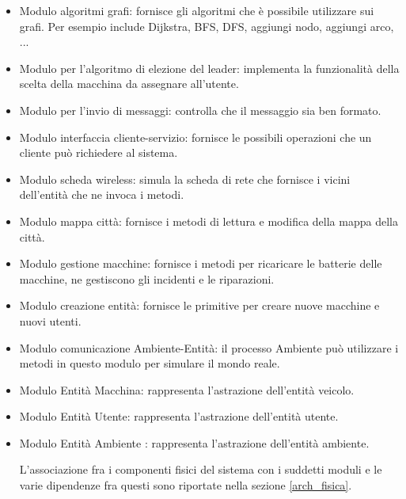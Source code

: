 \begin{itemize} 
	
	\item Modulo algoritmi grafi: fornisce gli algoritmi che è possibile utilizzare sui grafi. Per esempio include Dijkstra, BFS, DFS, aggiungi nodo, aggiungi arco, ... 
	
	\item Modulo per l'algoritmo di elezione del leader: implementa la funzionalità della scelta della macchina da assegnare all'utente.
	
	\item Modulo per l'invio di messaggi: controlla che il messaggio sia ben formato.
	
	\item Modulo interfaccia cliente-servizio: fornisce le possibili operazioni che un cliente può richiedere al sistema.
	
	\item Modulo scheda wireless: simula la scheda di rete che fornisce i vicini dell'entità che ne invoca i metodi.
	
	\item Modulo mappa città: fornisce i metodi di lettura e modifica della mappa della città.
	
	\item Modulo gestione macchine: fornisce i metodi per ricaricare le batterie delle macchine, ne gestiscono gli incidenti e le riparazioni.
	
	\item Modulo creazione entità: fornisce le primitive per creare nuove macchine e nuovi utenti.
	
	\item Modulo comunicazione Ambiente-Entità: il processo Ambiente può utilizzare i metodi in questo modulo per simulare il mondo reale.
	
	\item Modulo Entità Macchina: rappresenta l'astrazione dell'entità veicolo.
	
	\item Modulo Entità Utente: rappresenta l'astrazione dell'entità utente.
	
	\item Modulo Entità Ambiente : rappresenta l'astrazione dell'entità ambiente.
	
	L'associazione fra i componenti fisici del sistema con i suddetti moduli e le varie dipendenze fra questi sono riportate nella sezione \ref{arch_fisica}.
\end{itemize}

